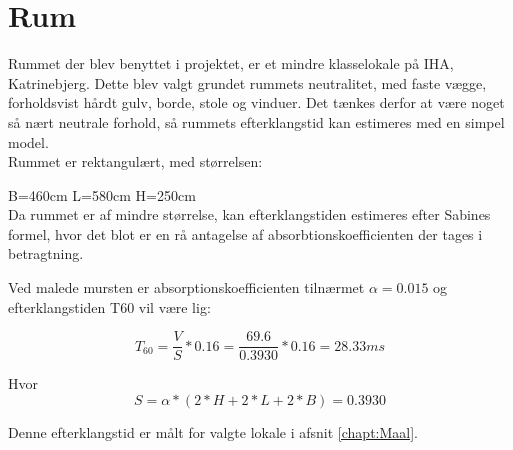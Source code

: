 \clearpage
\section{Rum}

Rummet der blev benyttet i projektet, er et mindre klasselokale på IHA, Katrinebjerg. 
Dette blev valgt grundet rummets neutralitet, med faste vægge, forholdsvist hårdt gulv, borde, stole og vinduer. Det tænkes derfor at være noget så nært neutrale forhold, så rummets efterklangstid kan estimeres med en simpel model. \\

Rummet er rektangulært, med størrelsen:

B=460cm \hspace{3cm}
L=580cm \hspace{3cm}
H=250cm\\

Da rummet er af mindre størrelse, kan efterklangstiden estimeres efter Sabines formel, hvor det blot er en rå antagelse af absorbtionskoefficienten der tages i betragtning. 

Ved malede mursten er absorptionskoefficienten tilnærmet $\alpha=0.015$ \cite{Attenuation} og efterklangstiden T60 vil være lig:

\begin{equation}\label{lign:T60}
	T_{60}=\frac{V}{S}*0.16=\frac{69.6}{0.3930}*0.16=28.33 ms
\end{equation}

Hvor
\begin{equation}
	S=\alpha*(2*H+2*L+2*B)=0.3930
\end{equation}


Denne efterklangstid er målt for valgte lokale i afsnit \ref{chapt:Maal}.
